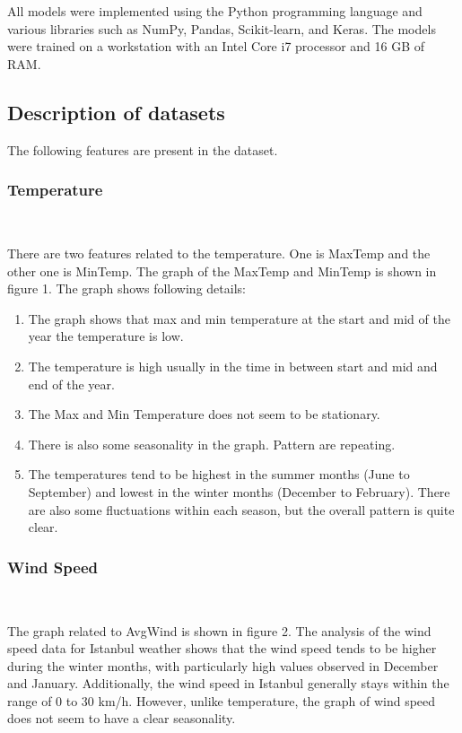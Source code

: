 \documentclass[conference,letterpaper]{IEEEtran}
\begin{document}
All models were implemented using the Python programming language and various libraries such as NumPy, Pandas, Scikit-learn, and Keras. The models were trained on a workstation with an Intel Core i7 processor and 16 GB of RAM.


\subsection{Description of datasets}
The following features are present in the dataset.

\subsubsection{Temperature}
\

There are two features related to the temperature. One is MaxTemp and the other one is MinTemp. The graph of the MaxTemp and MinTemp is shown in figure 1. The graph shows following details:
\begin{enumerate}
\item The graph shows that max and min temperature at the start and mid of the year the temperature is low.
\item The temperature is high usually in the time in between start and mid and end of the year.
\item The Max and Min Temperature does not seem to be stationary.
\item There is also some seasonality in the graph. Pattern are repeating.
\item The temperatures tend to be highest in the summer months (June to September) and lowest in the winter months (December to February). There are also some fluctuations within each season, but the overall pattern is quite clear.
\end{enumerate}

\subsubsection{Wind Speed}
\

The graph related to AvgWind is shown in figure 2. The analysis of the wind speed data for Istanbul weather shows that the wind speed tends to be higher during the winter months, with particularly high values observed in December and January. Additionally, the wind speed in Istanbul generally stays within the range of 0 to 30 km/h. However, unlike temperature, the graph of wind speed does not seem to have a clear seasonality.
\end{document}
